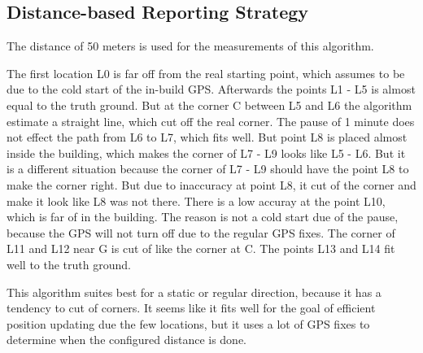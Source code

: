 \subsection{Distance-based Reporting Strategy}
The distance of 50 meters is used for the measurements of this algorithm.

The first location L0 is far off from the real starting point, which assumes to be due to the cold start of the in-build GPS. Afterwards the points L1 - L5 is almost equal to the truth ground. But at the corner C between L5 and L6 the algorithm estimate a straight line, which cut off the real corner. The pause of 1 minute does not effect the path from L6 to L7, which fits well. But point L8 is placed almost inside the building, which makes the corner of L7 - L9 looks like L5 - L6. But it is a different situation because the corner of L7 - L9 should have the point L8 to make the corner right. But due to inaccuracy at point L8, it cut of the corner and make it look like L8 was not there. There is a low accuray at the point L10, which is far of in the building. The reason is not a cold start due of the pause, because the GPS will not turn off due to the regular GPS fixes. The corner of L11 and L12 near G is cut of like the corner at C. The points L13 and L14 fit well to the truth ground.

This algorithm suites best for a static or regular direction, because it has a tendency to cut of corners. It seems like it fits well for the goal of efficient position updating due the few locations, but it uses a lot of GPS fixes to determine when the configured distance is done.